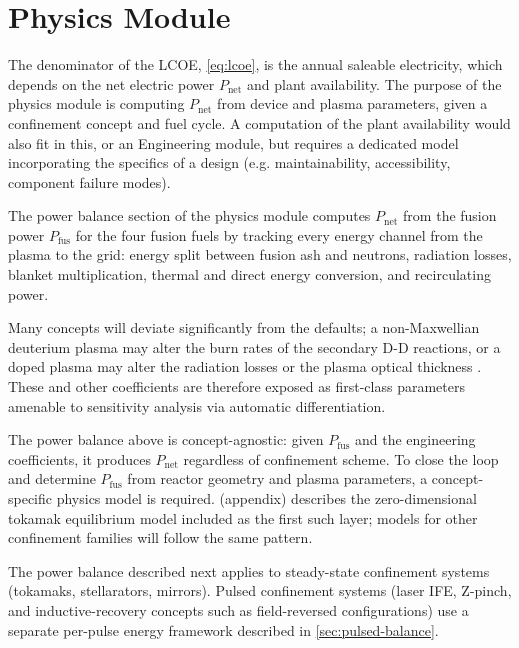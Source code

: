 \documentclass{article}
\begin{document}
\section{Physics Module}
\label{sec:physics-module}

The denominator of the LCOE, \cref{eq:lcoe}, is the annual saleable
electricity, which depends on the net electric power $P_{\text{net}}$ and plant availability.
The purpose of the physics module is computing $P_{\text{net}}$ from
device and plasma parameters, given a confinement concept and fuel cycle.
A computation of the plant availability would also fit in this, or an Engineering module,
but requires a dedicated model incorporating the specifics of a design (e.g. maintainability, accessibility, component failure modes).

The power balance section of the physics module computes $P_{\text{net}}$
from the fusion power $P_{\text{fus}}$ for the four fusion fuels by tracking
every energy channel from the plasma to the grid: energy split between fusion ash and neutrons,
radiation losses, blanket multiplication, thermal and direct energy conversion, and
recirculating power.

Many concepts will deviate significantly from the defaults; a non-Maxwellian
deuterium plasma may alter the burn rates of the secondary D-D reactions,
or a doped plasma may alter the radiation losses or the plasma optical thickness
\citep{frank2022}. These and other coefficients are therefore exposed as
first-class parameters amenable to sensitivity analysis via automatic differentiation.

The power balance above is concept-agnostic: given $P_{\text{fus}}$
and the engineering coefficients, it produces $P_{\text{net}}$
regardless of confinement scheme. To close the loop and determine
$P_{\text{fus}}$ from reactor geometry and plasma parameters, a
concept-specific physics model is required.
 (appendix) describes the zero-dimensional tokamak
equilibrium model included as the first such layer; models for other
confinement families will follow the same pattern.

The power balance described next applies to steady-state confinement
systems (tokamaks, stellarators, mirrors). Pulsed confinement
systems (laser IFE, Z-pinch, and inductive-recovery concepts such as
field-reversed configurations) use a separate per-pulse energy
framework described in \cref{sec:pulsed-balance}.
\end{document}
